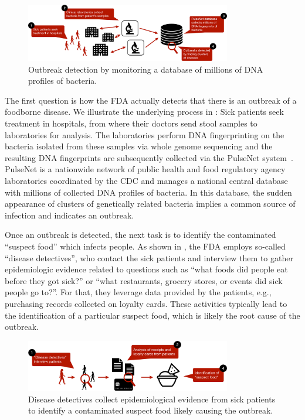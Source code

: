 \begin{figure}[h!]
    \centering
    \includegraphics[width=0.8\textwidth]{submissions/submission3/figures/outbreak-detection-crop.pdf}
    \caption{Outbreak detection by monitoring a database of millions of DNA profiles of bacteria.}
    \label{fig:outbreak}
\end{figure}

 The first question is how the FDA actually detects that there is an outbreak of a foodborne disease. We illustrate the underlying process in : Sick patients seek treatment in hospitals, from where their doctors send stool samples to laboratories for analysis. The laboratories perform DNA fingerprinting on the bacteria isolated from these samples via whole genome sequencing and the resulting DNA fingerprints are subsequently collected via the PulseNet system~\cite{cdcpulsenet}. PulseNet is a nationwide network of public health and food regulatory agency laboratories coordinated by the CDC and manages a national central database with millions of collected DNA profiles of bacteria. In this database, the sudden appearance of clusters of genetically related bacteria implies a common source of infection and indicates an outbreak.

 Once an outbreak is detected, the next task is to identify the contaminated ``suspect food'' which infects people. As shown in , the FDA employs so-called ``disease detectives'', who contact the sick patients and interview them to gather epidemiologic evidence related to questions such as ``what foods did people eat before they got sick?'' or ``what restaurants, grocery stores, or events did sick people go to?''. For that, they leverage data provided by the patients, e.g., purchasing records collected on loyalty cards. These activities typically lead to the identification of a particular suspect food, which is likely the root cause of the outbreak.

\begin{figure}[h!]
    \centering
    \includegraphics[width=0.8\textwidth]{submissions/submission3/figures/food-identification-crop.pdf}
    \caption{Disease detectives collect epidemiological evidence from sick patients to identify a contaminated suspect food likely causing the outbreak.}
    \label{fig:identification}
\end{figure}

